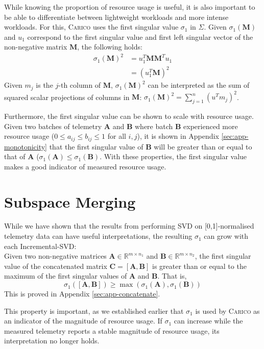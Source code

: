 While knowing the proportion of resource usage is useful, it is also important
to be able to differentiate between lightweight workloads and more intense
workloads. For this, \textsc{Carico} uses the first singular value $\sigma_1$ in
$\Sigma$. Given $\sigma_1(\mathbf{M})$ and $u_1$ correspond to the first singular value and
first left singular vector of the non-negative matrix $\mathbf{M}$, the
following holds:
\begin{align}
    \sigma_1(\mathbf{M})^2 &= u_1^T \mathbf{MM}^T u_1 \\
    &= (u_1^T \mathbf{M})^2
\end{align}
Given $m_j$ is the $j$-th column of $\mathbf{M}$, $\sigma_1(\mathbf{M})^2$ can be
interpreted as the sum of squared scalar projections of columns in $\mathbf{M}$:
$\sigma_1(\mathbf{M})^2 = \sum_{j=1}^n (u^T m_j)^2$.

Furthermore, the first singular value can be shown to scale with resource usage.
Given two batches of telemetry $\mathbf{A}$ and $\mathbf{B}$ where batch
$\mathbf{B}$ experienced more resource usage ($0 \leq a_{ij} \leq b_{ij} \leq 1$
for all $i,j$), it is shown in Appendix \ref{sec:app-monotonicity} that the
first singular value of $\mathbf{B}$ will be greater than or equal to that of
$\mathbf{A}$ ($\sigma_1(\mathbf{A}) \leq \sigma_1(\mathbf{B})$. With these
properties, the first singular value makes a good indicator of measured resource
usage.

\section{Subspace Merging}
\label{sec:local-merge}
While we have shown that the results from performing SVD on [0,1]-normalised
telemetry data can have useful interpretations, the resulting $\sigma_1$ can
grow with each Incremental-SVD:\\
Given two non-negative matrices $\mathbf{A} \in \mathbb{R}^{m \times n_1}$ and
$\mathbf{B} \in \mathbb{R}^{m \times n_2}$, the first singular value of the
concatenated matrix $\mathbf{C} = [\mathbf{A}, \mathbf{B}]$ is greater than or
equal to the maximum of the first singular values of $\mathbf{A}$ and
$\mathbf{B}$. That is,
\[ \sigma_1([\mathbf{A}, \mathbf{B}]) \geq \max(\sigma_1(\mathbf{A}),
\sigma_1(\mathbf{B})) \]
This is proved in Appendix \ref{sec:app-concatenate}.

This property is important, as we established earlier that $\sigma_1$ is used by
\textsc{Carico} as an indicator of the magnitude of resource usage. If
$\sigma_1$ can increase while the measured telemetry reports a stable magnitude
of resource usage, its interpretation no longer holds.

